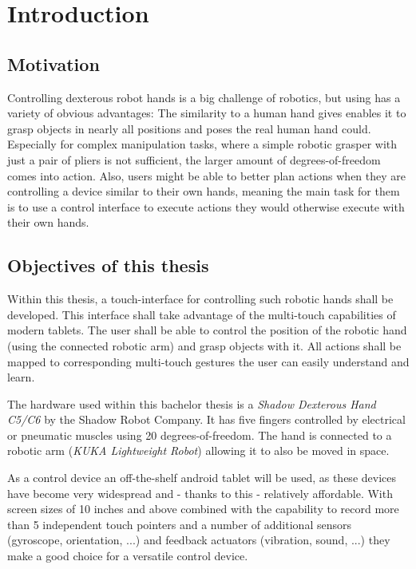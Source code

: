 \chapter{Introduction}
\section{Motivation}

Controlling dexterous robot hands is a big challenge of robotics, but using has a variety of obvious advantages: The similarity to a human hand gives enables it to grasp objects in nearly all positions and poses the real human hand could. Especially for complex manipulation tasks, where a simple robotic grasper with just a pair of pliers is not sufficient, the larger amount of degrees-of-freedom comes into action. Also, users might be able to better plan actions when they are controlling a device similar to their own hands, meaning the main task for them is to use a control interface to execute actions they would otherwise execute with their own hands.

\section{Objectives of this thesis}

Within this thesis, a touch-interface for controlling such robotic hands shall be developed. This interface shall take advantage of the multi-touch capabilities of modern tablets. The user shall be able to control the position of the robotic hand (using the connected robotic arm) and grasp objects with it. All actions shall be mapped to corresponding multi-touch gestures the user can easily understand and learn.

The hardware used within this bachelor thesis is a \textit{Shadow Dexterous Hand C5/C6} by the Shadow Robot Company. It has five fingers controlled by electrical or pneumatic muscles using 20 degrees-of-freedom\cite{web:robothand:spec}. The hand is connected to a robotic arm (\textit{KUKA Lightweight Robot}) allowing it to also be moved in space. %

As a control device an off-the-shelf android tablet will be used, as these devices have become very widespread and - thanks to this - relatively affordable. With screen sizes of 10 inches and above combined with the capability to record more than 5 independent touch pointers and a number of additional sensors (gyroscope, orientation, ...) and feedback actuators (vibration, sound, ...) they make a good choice for a versatile control device.

